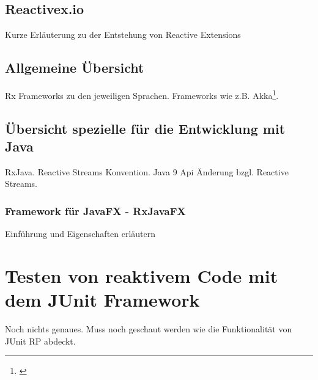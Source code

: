 \subsection{Reactivex.io}
Kurze Erläuterung zu der Entstehung von Reactive Extensions
\subsection{Allgemeine Übersicht}
Rx Frameworks zu den jeweiligen Sprachen. Frameworks wie z.B. Akka\footnote{\cite{DavidKarnok.2016}}. 
\subsection{Übersicht spezielle für die Entwicklung mit Java}
RxJava. Reactive Streams Konvention. Java 9 Api Änderung bzgl. Reactive Streams.
\subsubsection{Framework für JavaFX - RxJavaFX}
Einführung und Eigenschaften erläutern
\section{Testen von reaktivem Code mit dem JUnit Framework}
Noch nichts genaues. Muss noch geschaut werden wie die Funktionalität von JUnit RP abdeckt.